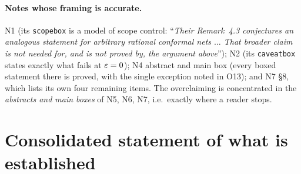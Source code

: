 \documentclass[11pt]{article}
\newcommand{\NI}{N1}\newcommand{\NII}{N2}\newcommand{\NIII}{N3}
\newcommand{\NIV}{N4}\newcommand{\NV}{N5}\newcommand{\NVI}{N6}\newcommand{\NVII}{N7}
\begin{document}
\paragraph{Notes whose framing is accurate.}
\NI{} (its \texttt{scopebox} is a model of scope control: ``\emph{Their Remark~4.3 conjectures an analogous statement
for arbitrary rational conformal nets $\dots$ That broader claim is not needed for, and is not proved by, the argument
above}'');
\NII{} (its \texttt{caveatbox} states exactly what fails at $\varepsilon=0$);
\NIV{} abstract and main box (every boxed statement there is proved, with the single exception noted in O13);
and \NVII{} \S8, which lists its own four remaining items.  The overclaiming is concentrated in the \emph{abstracts and
main boxes} of \NV, \NVI, \NVII, i.e.\ exactly where a reader stops.

\clearpage
\section{Consolidated statement of what is established}
\end{document}
